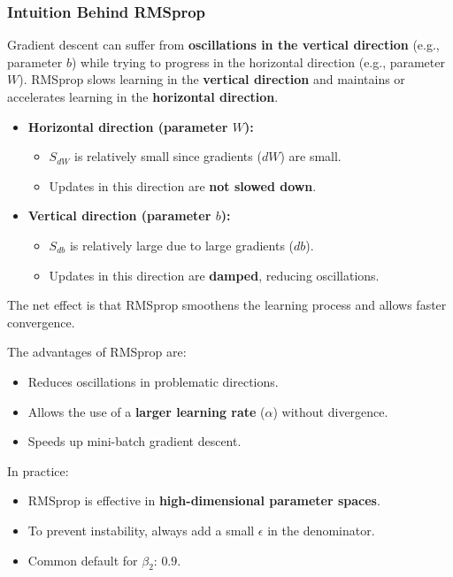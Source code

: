 \documentclass[letterpaper,12pt,notitlepage,twoside]{report}
\begin{document}
\subsubsection*{Intuition Behind RMSprop}
Gradient descent can suffer from \textbf{oscillations in the vertical direction} (e.g., parameter \( b \)) while trying to progress in the horizontal direction (e.g., parameter \( W \)). RMSprop slows learning in the \textbf{vertical direction} and maintains or accelerates learning in the \textbf{horizontal direction}.

\begin{itemize}[nosep]
    \item \textbf{Horizontal direction (parameter \( W \)):}
    \begin{itemize}
        \item \( S_{dW} \) is relatively small since gradients (\( dW \)) are small.
        \item Updates in this direction are \textbf{not slowed down}.
    \end{itemize}
    \item \textbf{Vertical direction (parameter \( b \)):}
    \begin{itemize}
        \item \( S_{db} \) is relatively large due to large gradients (\( db \)).
        \item Updates in this direction are \textbf{damped}, reducing oscillations.
    \end{itemize}
\end{itemize}

The net effect is that RMSprop smoothens the learning process and allows faster convergence.

The advantages of RMSprop are:
\begin{itemize}[nosep]
    \item Reduces oscillations in problematic directions.
    \item Allows the use of a \textbf{larger learning rate} (\( \alpha \)) without divergence.
    \item Speeds up mini-batch gradient descent.
\end{itemize}

In practice:
\begin{itemize}[noitemsep, topsep=0pt]
    \item RMSprop is effective in \textbf{high-dimensional parameter spaces}.
    \item To prevent instability, always add a small \( \epsilon \) in the denominator.
    \item Common default for \( \beta_2 \): \( 0.9 \).
\end{itemize}
\end{document}
